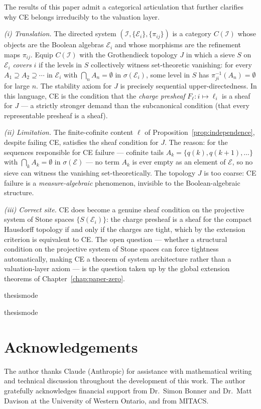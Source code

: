\begin{remark}
\label{rem:site-theoretic}
The results of this paper admit a categorical articulation that further clarifies
why CE belongs irreducibly to the valuation layer.

\emph{(i) Translation.}
The directed system $(\mathcal{I}, \{\mathcal{E}_i\}, \{\pi_{ij}\})$ is a category
$C(\mathcal{I})$ whose objects are the Boolean algebras $\mathcal{E}_i$ and whose
morphisms are the refinement maps $\pi_{ij}$.  Equip $C(\mathcal{I})$ with the
Grothendieck topology $J$ in which a sieve $S$ on $\mathcal{E}_i$ \emph{covers}
$i$ if the levels in $S$ collectively witness set-theoretic vanishing: for every
$A_1 \supseteq A_2 \supseteq \cdots$ in $\mathcal{E}_i$ with
$\bigcap_n A_n = \emptyset$ in $\sigma(\mathcal{E}_i)$, some level in $S$ has
$\pi_{ji}^{-1}(A_n) = \emptyset$ for large $n$.
The stability axiom for $J$ is precisely sequential upper-directedness.
In this language, CE is the condition that the \emph{charge presheaf}
$F_\ell \colon i \mapsto \ell_i$ is a sheaf for $J$ --- a strictly stronger
demand than the subcanonical condition (that every representable presheaf is a sheaf).

\emph{(ii) Limitation.}
The finite-cofinite content $\ell$ of Proposition~\ref{prop:independence}, despite
failing CE, satisfies the sheaf condition for $J$.  The reason: for the sequences
responsible for CE failure --- cofinite tails $A_k = \{q(k), q(k{+}1), \ldots\}$
with $\bigcap_k A_k = \emptyset$ in $\sigma(\mathcal{E})$ --- no term $A_k$ is
ever empty as an element of $\mathcal{E}$, so no sieve can witness the vanishing
set-theoretically.  The topology $J$ is too coarse: CE failure is a
\emph{measure-algebraic} phenomenon, invisible to the Boolean-algebraic structure.

\emph{(iii) Correct site.}
CE does become a genuine sheaf condition on the projective system of Stone spaces
$\{S(\mathcal{E}_i)\}$: the charge presheaf is a sheaf for the compact Hausdorff
topology if and only if the charges are tight, which by the extension criterion
is equivalent to CE.  The open question --- whether a structural condition on
the projective system of Stone spaces can force tightness automatically, making
CE a theorem of system architecture rather than a valuation-layer axiom --- is
the question taken up by the global extension theorems of
Chapter~\ref{chap:paper-zero}.
\end{remark}

\ifcsname thesismode\endcsname\else


\fi

\ifcsname thesismode\endcsname\else
\section*{Acknowledgements}

The author thanks Claude (Anthropic) for assistance with mathematical writing and
technical discussion throughout the development of this work.  The author gratefully
acknowledges financial support from Dr.\ Simon Bonner and Dr.\ Matt Davison at the
University of Western Ontario, and from MITACS.
\fi
